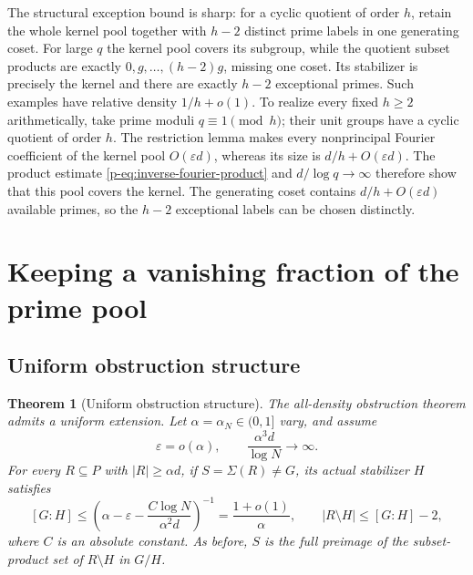 \documentclass[11pt,a4paper]{article}
\newtheorem{theorem}{Theorem}[section]
\theoremstyle{definition}
\theoremstyle{remark}
\begin{document}
The structural exception bound is sharp: for a cyclic quotient of
order $h$, retain the whole kernel pool together with $h-2$ distinct
prime labels in one generating coset. For large $q$ the kernel pool
covers its subgroup, while the quotient subset products are exactly
$0,g,\ldots,(h-2)g$, missing one coset. Its stabilizer is precisely
the kernel and there are exactly $h-2$ exceptional primes. Such
examples have relative density $1/h+o(1)$. To realize every fixed
$h\geq2$ arithmetically, take prime moduli $q\equiv1\pmod h$;
their unit groups have a cyclic quotient of order $h$. The restriction
lemma makes every nonprincipal Fourier coefficient of the kernel
pool $O(\varepsilon d)$, whereas its size is $d/h+O(\varepsilon d)$.
The product estimate \eqref{p-eq:inverse-fourier-product} and
$d/\log q\to\infty$ therefore show that this pool covers the kernel.
The generating coset contains $d/h+O(\varepsilon d)$ available primes,
so the $h-2$ exceptional labels can be chosen distinctly.






\section{Keeping a vanishing fraction of the prime pool}

\subsection{Uniform obstruction structure}

\begin{theorem}[Uniform obstruction structure]\label{p-thm:vanishing-structure}
The all-density obstruction theorem admits a uniform extension. Let
$\alpha=\alpha_N\in(0,1]$ vary, and assume
\begin{equation}\label{p-eq:vd-assumptions}
 \varepsilon=o(\alpha),\qquad
 \frac{\alpha^3 d}{\log N}\longrightarrow\infty.
\end{equation}
For every $R\subseteq P$ with $|R|\geq\alpha d$, if
$S=\Sigma(R)\ne G$, its actual stabilizer $H$ satisfies
\begin{equation}\label{p-eq:vd-structure}
 [G:H]\leq
 \left(\alpha-\varepsilon-
       \frac{C\log N}{\alpha^2d}\right)^{-1}
 =\frac{1+o(1)}{\alpha},
 \qquad
 |R\setminus H|\leq[G:H]-2,
\end{equation}
where $C$ is an absolute constant. As before, $S$ is the full preimage
of the subset-product set of $R\setminus H$ in $G/H$.
\end{theorem}
\end{document}
